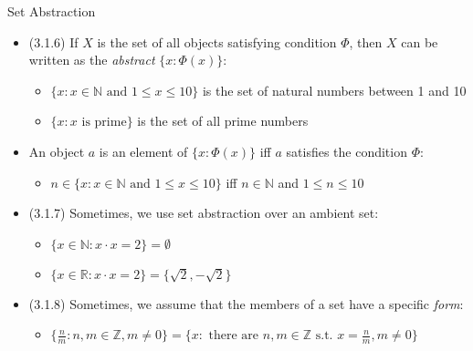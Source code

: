 \documentclass[../slides.tex]{subfiles}
\begin{document}
\begin{frame}{Set Abstraction}


	\begin{itemize}

		\item (3.1.6) If $X$ is the set of all objects satisfying condition $\Phi$, then $X$ can be written as the \emph{abstract} $\{x:\Phi(x)\}$:
		
		\begin{itemize}
		
			\item $\{x: x\in\mathbb{N}\text{ and }1\leq x\leq 10\}$ is the set of natural numbers between 1 and 10
			
			\item $\{x: x\text{ is prime}\}$ is the set of all prime numbers
		
		\end{itemize}
		
		\item An object $a$ is an element of $\{x:\Phi(x)\}$ iff $a$ satisfies the condition $\Phi$:
		
		\begin{itemize}
					
			\item $n\in \{x: x\in\mathbb{N}\text{ and }1\leq x\leq 10\}$ iff $n\in\mathbb{N}$ and $1\leq n\leq 10$
		
		\end{itemize}
		
		\item (3.1.7) Sometimes, we use set abstraction over an ambient set:
		
		\begin{itemize}
		
			\item $\{x\in \mathbb{N}:x\cdot x=2\}=\emptyset$
			
			\item $\{x\in \mathbb{R}:x\cdot x=2\}=\{\sqrt{2},-\sqrt{2}\}$
					
		\end{itemize}
		
		\item (3.1.8) Sometimes, we assume that the members of a set have a specific \emph{form}:
	
		\begin{itemize}
		
			\item $\{\frac{n}{m}:n,m\in \mathbb{Z},m\neq 0\}=\{x: \text{ there are }n,m\in \mathbb{Z}\text{ s.t. }x=\frac{n}{m},m\neq 0 \}$
		
		\end{itemize}
	
	\end{itemize}

\end{frame}
\end{document}
